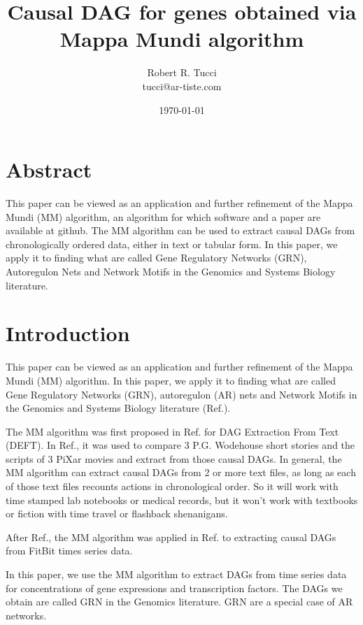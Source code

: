 \documentclass[12pt]{article}
\begin{document}
\title{Causal DAG for genes obtained via Mappa Mundi algorithm}
\date{ \today}
\author{Robert R. Tucci\\
        tucci@ar-tiste.com}
\maketitle
\vskip2cm
\section*{Abstract}
This paper can be viewed
as an application and further refinement 
of the Mappa Mundi (MM) algorithm,
an algorithm  for which software and a paper are available at github. 
The MM algorithm can be used to extract
causal DAGs from chronologically ordered data, either in text or tabular form. 
In this paper, we apply it to finding what
are called Gene Regulatory Networks (GRN),
Autoregulon  Nets
and Network Motifs 
in the Genomics and Systems Biology literature.
\section{Introduction}

This paper can be viewed
as an application and further refinement 
of the Mappa Mundi (MM) algorithm.  
In this paper, we apply it to finding what
are called Gene Regulatory Networks (GRN),
autoregulon (AR) nets
and Network Motifs 
in the Genomics and Systems Biology literature (Ref.\cite{alon-book}).


The MM algorithm
was first proposed in Ref.\cite{mappa-mundi} 
for DAG Extraction From Text (DEFT). 
In Ref.\cite{mappa-mundi}, it was used to compare 3 P.G. Wodehouse short stories and the scripts of 3 PiXar movies
and extract from those causal DAGs.
In general, the MM algorithm can extract causal DAGs from 2 or more 
text files, as long as each of
those text files recounts actions 
in chronological order. So it will work with time stamped lab
notebooks or medical records, 
but it won't work with textbooks or fiction with  time travel or flashback shenanigans.

After Ref.\cite{mappa-mundi}, the MM algorithm was applied in Ref.\cite{causal-fitbit} to extracting causal DAGs from FitBit times
series data.

In this paper, we use the MM algorithm
to extract DAGs from time series data for
concentrations of
gene expressions and transcription factors.
The DAGs we obtain are called GRN
in the Genomics literature. GRN are a
special case of AR networks.
\end{document}

